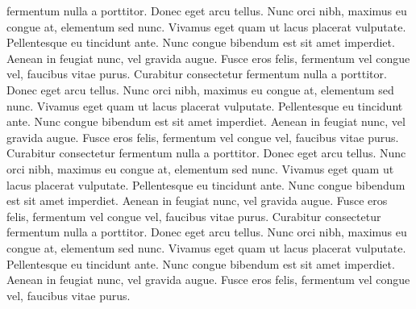\documentclass[]{aleph-notas-test}
\begin{document}
fermentum nulla a porttitor. Donec eget arcu tellus. Nunc orci nibh, maximus eu congue at, elementum sed nunc. Vivamus eget quam ut lacus placerat vulputate. Pellentesque eu tincidunt ante. Nunc congue bibendum est sit amet imperdiet. Aenean in feugiat nunc, vel gravida augue. Fusce eros felis, fermentum vel congue vel, faucibus vitae purus.
Curabitur consectetur fermentum nulla a porttitor. Donec eget arcu tellus. Nunc orci nibh, maximus eu congue at, elementum sed nunc. Vivamus eget quam ut lacus placerat vulputate. Pellentesque eu tincidunt ante. Nunc congue bibendum est sit amet imperdiet. Aenean in feugiat nunc, vel gravida augue. Fusce eros felis, fermentum vel congue vel, faucibus vitae purus.
Curabitur consectetur fermentum nulla a porttitor. Donec eget arcu tellus. Nunc orci nibh, maximus eu congue at, elementum sed nunc. Vivamus eget quam ut lacus placerat vulputate. Pellentesque eu tincidunt ante. Nunc congue bibendum est sit amet imperdiet. Aenean in feugiat nunc, vel gravida augue. Fusce eros felis, fermentum vel congue vel, faucibus vitae purus.
Curabitur consectetur fermentum nulla a porttitor. Donec eget arcu tellus. Nunc orci nibh, maximus eu congue at, elementum sed nunc. Vivamus eget quam ut lacus placerat vulputate. Pellentesque eu tincidunt ante. Nunc congue bibendum est sit amet imperdiet. Aenean in feugiat nunc, vel gravida augue. Fusce eros felis, fermentum vel congue vel, faucibus vitae purus.
\end{document}

